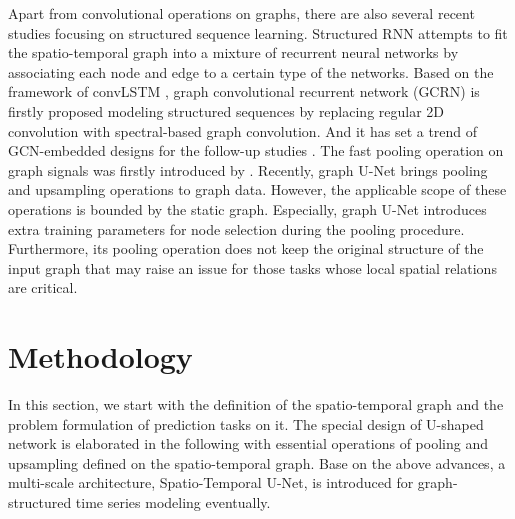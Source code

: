 \documentclass[sigconf,screen]{acmart}
\begin{document}
Apart from convolutional operations on graphs, there are also several recent studies focusing on structured sequence learning. Structured RNN \cite{jain2016structural} attempts to fit the spatio-temporal graph into a mixture of recurrent neural networks by associating each node and edge to a certain type of the networks. Based on the framework of convLSTM \cite{xingjian2015convolutional}, graph convolutional recurrent network (GCRN) \cite{seo2018structured} is firstly proposed modeling structured sequences by replacing regular 2D convolution with spectral-based graph convolution. And it has set a trend of GCN-embedded designs for the follow-up studies \cite{li2018dcrnn_traffic,yu2018spatio}.
The fast pooling operation on graph signals was firstly introduced by \cite{defferrard2016convolutional}. Recently, graph U-Net \cite{gao2019graph} brings pooling and upsampling operations to graph data. However, the applicable scope of these operations  is bounded by the static graph. Especially, graph U-Net introduces extra training parameters for node selection during the pooling procedure. Furthermore, its pooling operation does not keep the original structure of the input graph that may raise an issue for those tasks whose local spatial relations are critical.


\section{Methodology}
In this section, we start with the definition of the spatio-temporal graph and the problem formulation of prediction tasks on it. The special design of U-shaped network is elaborated in the following with essential operations of pooling and upsampling defined on the spatio-temporal graph. Base on the above advances, a multi-scale architecture, Spatio-Temporal U-Net, is introduced for graph-structured time series modeling eventually.
\end{document}
